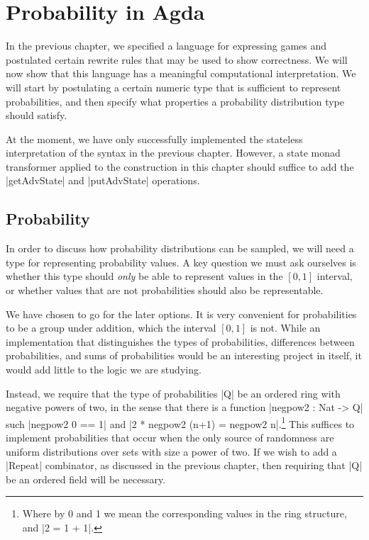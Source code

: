 \chapter{Probability in Agda}

In the previous chapter, we specified a language for expressing games and postulated certain rewrite rules that may be
used to show correctness.  We will now show that this language has a meaningful computational interpretation.  We will
start by postulating a certain numeric type that is sufficient to represent probabilities, and then specify what
properties a probability distribution type should satisfy.

At the moment, we have only successfully implemented the stateless interpretation of the syntax in the previous chapter.
However, a state monad transformer applied to the construction in this chapter should suffice to add the |getAdvState|
and |putAdvState| operations.

\section{Probability}

In order to discuss how probability distributions can be sampled, we will need a type for representing probability
values.  A key question we must ask ourselves is whether this type should \emph{only} be able to represent values in the
$[0, 1]$ interval, or whether values that are not probabilities should also be representable.

We have chosen to go for the later options.  It is very convenient for probabilities to be a group under addition, which
the interval $[0, 1]$ is not.  While an implementation that distinguishes the types of probabilities, differences
between probabilities, and sums of probabilities would be an interesting project in itself, it would add little to the
logic we are studying.

Instead, we require that the type of probabilities |Q| be an ordered ring with negative powers of two, in the sense that
there is a function |negpow2 : Nat -> Q| such |negpow2 0 == 1| and |2 * negpow2 (n+1) = negpow2 n|.\footnote{Where by 0
and 1 we mean the corresponding values in the ring structure, and |2 = 1 + 1|.}  This suffices to implement
probabilities that occur when the only source of randomness are uniform distributions over sets with size a power of
two.  If we wish to add a |Repeat| combinator, as discussed in the previous chapter, then requiring that |Q| be an
ordered field will be necessary.

